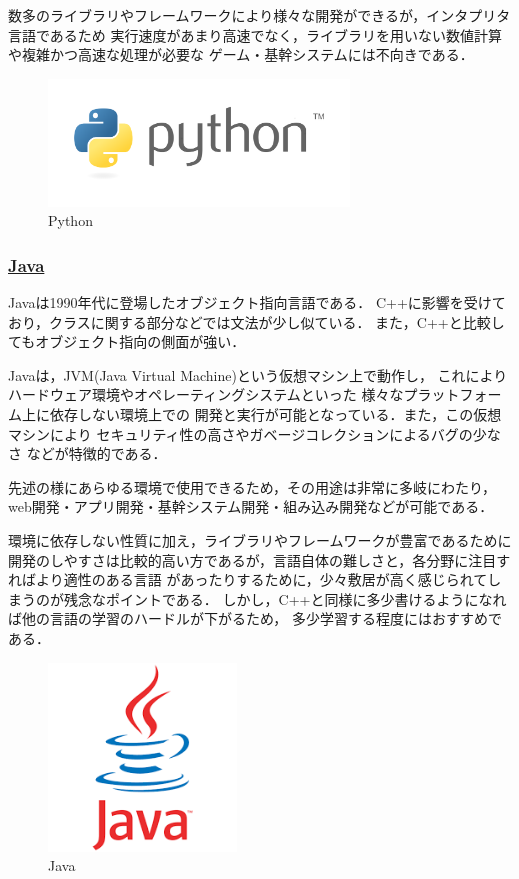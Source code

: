 \documentclass[autodetect-engine,dvi=dvipdfmx,ja=standard,a4j]{bxjsarticle}
\begin{document}
数多のライブラリやフレームワークにより様々な開発ができるが，インタプリタ言語であるため
実行速度があまり高速でなく，ライブラリを用いない数値計算や複雑かつ高速な処理が必要な
ゲーム・基幹システムには不向きである．

\begin{figure}[H]
    \centering
    \includegraphics[width=80mm]{image/python.png}
    \caption*{Python}
    \label{fig:Python}
\end{figure}

\subsubsection*{\underline{\textbf{Java}}}
Javaは1990年代に登場したオブジェクト指向言語である．
C++に影響を受けており，クラスに関する部分などでは文法が少し似ている．
また，C++と比較してもオブジェクト指向の側面が強い．

Javaは，JVM(Java Virtual Machine)という仮想マシン上で動作し，
これによりハードウェア環境やオペレーティングシステムといった
様々なプラットフォーム上に依存しない環境上での
開発と実行が可能となっている．また，この仮想マシンにより
セキュリティ性の高さやガベージコレクションによるバグの少なさ
などが特徴的である．

先述の様にあらゆる環境で使用できるため，その用途は非常に多岐にわたり，
web開発・アプリ開発・基幹システム開発・組み込み開発などが可能である．

環境に依存しない性質に加え，ライブラリやフレームワークが豊富であるために
開発のしやすさは比較的高い方であるが，言語自体の難しさと，各分野に注目すればより適性のある言語
があったりするために，少々敷居が高く感じられてしまうのが残念なポイントである．
しかし，C++と同様に多少書けるようになれば他の言語の学習のハードルが下がるため，
多少学習する程度にはおすすめである．

\begin{figure}[H]
    \centering
    \includegraphics[width=50mm]{image/Java.png}
    \caption*{Java}
    \label{fig:Java}
\end{figure}
\end{document}
